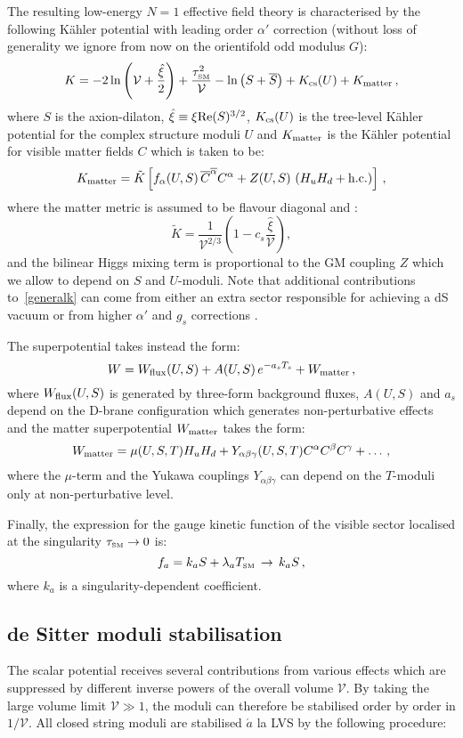 \documentclass[11pt,a4paper]{article}
\newcommand{\be}{\begin{equation}}
\newcommand{\ee}{\end{equation}}
\def\SM{{\scriptscriptstyle \rm SM}}
\newcommand\vo{{\mathcal{V}}}
\newcommand{\ov}{\overline}
\begin{document}
The resulting low-energy $N=1$ effective field theory is characterised by the following K\"ahler potential with leading order $\alpha'$ correction (without loss of generality we ignore from now on the orientifold odd modulus $G$):
\be
K = - 2 \ln\left(\vo + \frac{\hat\xi}{2}\right) + \frac{\tau_\SM^2}{\vo} - \ln\left(S+\overline{S}\right) + K_{\rm cs}(U) + K_{\rm matter}\,,
\label{generalk}
\ee
where $S$ is the axion-dilaton, $\hat\xi\equiv \xi {\rm Re}(S)^{3/2}$, $K_{\rm cs}(U)$ is the tree-level K\"ahler potential for the complex structure moduli $U$ and $K_{\rm matter}$ is the K\"ahler potential for visible matter fields $C$ which is taken to be:
\be
K_{\rm matter} = \tilde{K}\left[f_\alpha(U,S)\,\ov{C}^{\ov{\alpha}} C^\alpha + Z(U,S)\,\left(H_u H_d + {\rm h.c.}\right)\right]\,,
\label{kmatter}
\ee
where the matter metric is assumed to be flavour diagonal and \cite{SoftTermsSeqLVS}: 
\be
\tilde{K}=\frac{1}{\vo^{2/3}}\left(1-c_s\frac{\hat\xi}{\vo}\right),
\label{Ktilde}
\ee
and the bilinear Higgs mixing term is proportional to the GM coupling $Z$ which we allow to depend on $S$ and $U$-moduli. Note that additional contributions to~\eqref{generalk} can come from either an extra sector responsible for achieving a dS vacuum or from higher $\alpha'$ and $g_s$ corrections \cite{Berg:2007wt, extendednoscale}.

The superpotential takes instead the form:
\be
W = W_{\rm flux}(U,S) + A(U,S)\,e^{-a_s T_s} + W_{\rm matter}\,,
\label{sp}
\ee
where $W_{\rm flux}(U,S)$ is generated by three-form background fluxes, $A(U,S)$ and $a_s$ depend on the D-brane configuration which generates non-perturbative effects and the matter superpotential $W_{\rm matter}$ takes the form:
\be
W_{\rm matter} = \mu(U,S,T) H_u H_d + Y_{\alpha \beta \gamma}(U,S,T)  C^\alpha C^\beta C^\gamma + \dots\,,
\ee
where the $\mu$-term and the Yukawa couplings $Y_{\alpha \beta \gamma}$ can depend on the $T$-moduli only at non-perturbative level.

Finally, the expression for the gauge kinetic function of the visible sector localised at the singularity $\tau_\SM\to 0$ is:
\be
f_a = k_a S+ \lambda_a T_\SM\,\to\, k_a S\,,
\label{gkf}
\ee
where $k_a$ is a singularity-dependent coefficient. 


\subsection{de Sitter moduli stabilisation}
\label{mss}

The scalar potential receives several contributions from various effects which are suppressed by different inverse powers of the overall volume $\vo$. By taking the large volume limit $\vo\gg 1$, the moduli can therefore be stabilised order by order in $1/\vo$. All closed string moduli are stabilised $\acute{a}$ la LVS by the following procedure:
\end{document}
